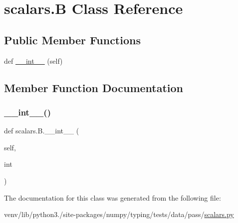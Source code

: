 \hypertarget{classscalars_1_1B}{}\section{scalars.\+B Class Reference}
\label{classscalars_1_1B}
\subsection*{Public Member Functions}
\begin{DoxyCompactItemize}
\item 
def \hyperlink{classscalars_1_1B_aa1ed76ece003feba34322c136b70e9be}{\+\_\+\+\_\+int\+\_\+\+\_\+} (self)
\end{DoxyCompactItemize}


\subsection{Member Function Documentation}
\mbox{\label{classscalars_1_1B_aa1ed76ece003feba34322c136b70e9be}} 
\subsubsection{\texorpdfstring{\+\_\+\+\_\+int\+\_\+\+\_\+()}{\_\_int\_\_()}}
{\footnotesize\ttfamily def scalars.\+B.\+\_\+\+\_\+int\+\_\+\+\_\+ (\begin{DoxyParamCaption}\item[{}]{self,  }\item[{}]{int }\end{DoxyParamCaption})}



The documentation for this class was generated from the following file\+:\begin{DoxyCompactItemize}
\item 
venv/lib/python3./site-\/packages/numpy/typing/tests/data/pass/\hyperlink{pass_2scalars_8py}{scalars.\+py}\end{DoxyCompactItemize}
